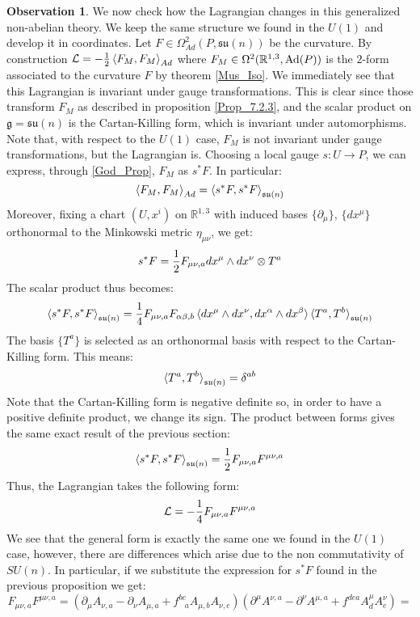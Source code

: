 \documentclass[12pt,a4paper]{report}
\theoremstyle{definition}
\theoremstyle{Theorem}
\theoremstyle{definition}
\theoremstyle{definition}
\newtheorem{Obs}[Def]{Observation}
\begin{document}
	\begin{Obs}
		We now check how the Lagrangian changes in this generalized non-abelian theory. We keep the same structure we found in the $U(1)$ and develop it in coordinates. Let $F\in\Omega^2_{Ad}(P,\mathfrak{su}(n))$ be the curvature. By construction $\mathcal{L}=-{1\over 2}\braket{F_M,F_M}_{Ad}$ where $F_M\in \Omega^2(\mathbb{R}^{1,3},\hbox{Ad}(P))$ is the $2$-form associated to the curvature $F$ by theorem \ref{Mus_Iso}. We immediately see that this Lagrangian is invariant under gauge transformations. This is clear since those transform $F_M$ as described in proposition \ref{Prop_7.2.3}, and the scalar product on $\mathfrak{g}=\mathfrak{su}(n)$ is the Cartan-Killing form, which is invariant under automorphisms.\\
		Note that, with respect to the $U(1)$ case, $F_M$ is not invariant under gauge transformations, but the Lagrangian is. Choosing a local gauge $s:U\rightarrow P$, we can express, through \ref{God_Prop}, $F_M$ as $s^*F$. In particular:
		$$\braket{F_M,F_M}_{Ad}=\braket{s^*F,s^*F}_{\mathfrak{su}(n)}$$
		Moreover, fixing a chart $(U,x^i)$ on $\mathbb{R}^{1,3}$ with induced bases $\{\partial_\mu\}$, $\{dx^\mu\}$ orthonormal to the Minkowski metric $\eta_{\mu\nu}$, we get:
		$$s^*F={1\over 2}F_{\mu\nu,a}dx^\mu\wedge dx^\nu\otimes T^a$$
		The scalar product thus becomes:
		$$\braket{s^*F,s^*F}_{\mathfrak{su}(n)}={1\over 4}F_{\mu\nu,a}F_{\alpha\beta,b}\braket{dx^\mu\wedge dx^\nu,dx^\alpha\wedge dx^\beta}\braket{T^a,T^b}_{\mathfrak{su}(n)}$$
		The basis $\{T^a\}$ is selected as an orthonormal basis with respect to the Cartan-Killing form. This means:
		$$\braket{T^a,T^b}_{\mathfrak{su}(n)}=\delta^{ab}$$
		Note that the Cartan-Killing form is negative definite so, in order to have a positive definite product, we change its sign. The product between forms gives the same exact result of the previous section:
		$$\braket{s^*F,s^*F}_{\mathfrak{su}(n)}={1\over 2}F_{\mu\nu,a}F^{\mu\nu,a}$$
		Thus, the Lagrangian takes the following form:
		$$\mathcal{L}=-{1\over 4}F_{\mu\nu,a}F^{\mu\nu,a}$$
		We see that the general form is exactly the same one we found in the $U(1)$ case, however, there are differences which arise due to the non commutativity of $SU(n)$. In particular, if we substitute the expression for $s^*F$ found in the previous proposition we get:
		$$F_{\mu\nu,a}F^{\mu\nu,a}=(\partial_\mu A_{\nu,a}-\partial_\nu A_{\mu,a}+f^{bc}_{\hspace{9pt}a}A_{\mu,b}A_{\nu,c})(\partial^\mu A^{\nu,a}-\partial^\nu A^{\mu,a}+f^{dea}A^{\mu}_dA^{\nu}_e)=$$

\end{Obs}
\end{document}
